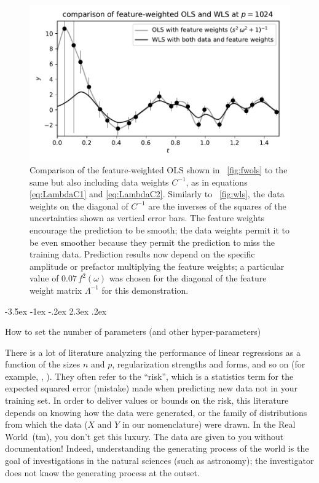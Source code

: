 \documentclass[12pt,letterpaper]{article}
\makeatletter
\newlength{\figurewidth}
\renewcommand\section{\@startsection {section}{1}{\z@}%
  {-3.5ex \@plus -1ex \@minus -.2ex}%
  {2.3ex \@plus.2ex}%
  {\raggedright\normalfont\Large\bfseries}}
\makeatother
\begin{document}
\begin{figure}[t]
    \begin{mdframed}
    \includegraphics[width=\figurewidth]{paper/weighted-WLS.pdf}
    \caption{Comparison of the feature-weighted OLS shown in \figurename~\ref{fig:fwols} to the same but also including data weights $C^{-1}$, as in equations \eqref{eq:LambdaC1} and \eqref{eq:LambdaC2}.
    Similarly to \figurename~\ref{fig:wls}, the data weights on the diagonal of $C^{-1}$ are the inverses of the squares of the uncertainties shown as vertical error bars. The feature weights encourage the prediction to be smooth; the data weights permit it to be even smoother because they permit the prediction to miss the training data.
    Prediction results now depend on the specific amplitude or prefactor multiplying the feature weights; a particular value of $0.07\,f^2(\omega)$ was chosen for the diagonal of the feature weight matrix $\Lambda^{-1}$ for this demonstration.}
    \label{fig:fwwls}
    \end{mdframed}
\end{figure}

\section{How to set the number of parameters (and other hyper-parameters)}\label{sec:dd}

There is a lot of literature analyzing the performance of linear regressions as a function of the sizes $n$ and $p$, regularization strengths and forms, and so on (for example, \citealt{bartlett2020benign}, \citealt{hastie2019surprises}).
They often refer to the ``risk'', which is a statistics term for the expected squared error (mistake) made when predicting new data not in your training set.
In order to deliver values or bounds on the risk, this literature depends on knowing how the data were generated, or the family of distributions from which the data ($X$ and $Y$ in our nomenclature) were drawn.
In the Real World~(tm), you don't get this luxury.
The data are given to you without documentation!
Indeed, understanding the generating process of the world is the goal of investigations in the natural sciences (such as astronomy); the investigator does not know the generating process at the outset.
\end{document}
